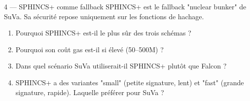 \documentclass[12pt, a4paper]{article}
\begin{document}
\begin{exercice}{4 --- SPHINCS+ comme fallback}
SPHINCS+ est le fallback "nuclear bunker" de SuVa.
Sa sécurité repose uniquement sur les fonctions de hachage.
\begin{enumerate}[label=\alph*)]
  \item Pourquoi SPHINCS+ est-il le plus sûr des trois schémas ?
  \item Pourquoi son coût gas est-il si élevé (50--500M) ?
  \item Dans quel scénario SuVa utiliserait-il SPHINCS+ plutôt que Falcon ?
  \item SPHINCS+ a des variantes "small" (petite signature, lent) et
        "fast" (grande signature, rapide). Laquelle préférer pour SuVa ?
\end{enumerate}
\end{exercice}
\end{document}
